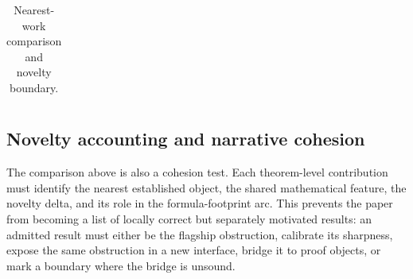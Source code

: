\documentclass[11pt]{article}
\theoremstyle{definition}
\begin{document}
\begin{table}[htbp]
\begin{tabularx}{\textwidth}{@{}p{}p{}X@{}}
\bottomrule
\end{tabularx}
\caption{Nearest-work comparison and novelty boundary.}
\label{tab:related-boundary}
\end{table}

\subsection{Novelty accounting and narrative cohesion}

The comparison above is also a cohesion test.  Each theorem-level contribution
must identify the nearest established object, the shared mathematical feature,
the novelty delta, and its role in the formula-footprint arc.  This prevents the
paper from becoming a list of locally correct but separately motivated results:
an admitted result must either be the flagship obstruction, calibrate its
sharpness, expose the same obstruction in a new interface, bridge it to proof
objects, or mark a boundary where the bridge is unsound.
\end{document}
